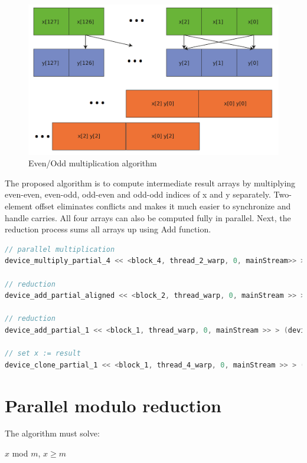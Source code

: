 \documentclass[oneside,openright,12pt,final,en]{mgr}
\begin{document}
\begin{figure}[H]
	\centering
	\includegraphics[width=\textwidth]{all_mull}
	\caption{Even/Odd multiplication algorithm}
	\label{fig:al_mull}
\end{figure}

The proposed algorithm is to compute intermediate result arrays by multiplying even-even, even-odd, odd-even and odd-odd indices of x and y separately. Two-element offset eliminates conflicts and makes it much easier to synchronize and handle carries. All four arrays can also be computed fully in parallel. Next, the reduction process sums all arrays up using Add function.

\begin{lstlisting}[language=cpp]
// parallel multiplication
device_multiply_partial_4 << <block_4, thread_2_warp, 0, mainStream>> > (device4arrays, device_x, device_y);

// reduction
device_add_partial_aligned << <block_2, thread_warp, 0, mainStream >> > (device4arrays, device4arrays + 2 * 128);

// reduction	
device_add_partial_1 << <block_1, thread_warp, 0, mainStream >> > (device4arrays, device4arrays + 128);

// set x := result
device_clone_partial_1 << <block_1, thread_4_warp, 0, mainStream >> > (device_x, device4arrays);
\end{lstlisting}
 

\section{Parallel modulo reduction}

The algorithm must solve:

\begin{center}
	$x$ mod $m$, $x \geq m$
\end{center}
\end{document}
